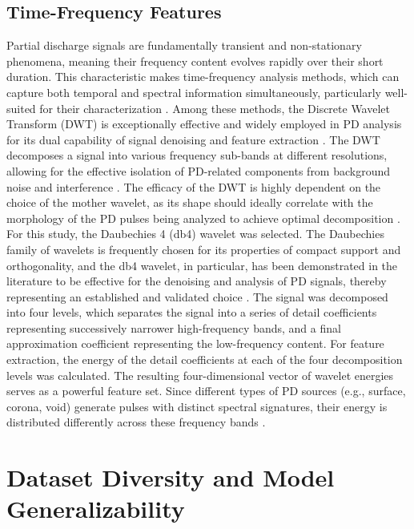\subsection{Time-Frequency Features}

Partial discharge signals are fundamentally transient and non-stationary phenomena, meaning their frequency content evolves rapidly over their short duration. This characteristic makes time-frequency analysis methods, which can capture both temporal and spectral information simultaneously, particularly well-suited for their characterization \parencite{Li_2018}. Among these methods, the Discrete Wavelet Transform (DWT) is exceptionally effective and widely employed in PD analysis for its dual capability of signal denoising and feature extraction \parencite{Lu_2020_2}. The DWT decomposes a signal into various frequency sub-bands at different resolutions, allowing for the effective isolation of PD-related components from background noise and interference \parencite{Sahnoune_2024}. The efficacy of the DWT is highly dependent on the choice of the mother wavelet, as its shape should ideally correlate with the morphology of the PD pulses being analyzed to achieve optimal decomposition \parencite{Sahnoune_2024}. For this study, the Daubechies 4 (db4) wavelet was selected. The Daubechies family of wavelets is frequently chosen for its properties of compact support and orthogonality, and the db4 wavelet, in particular, has been demonstrated in the literature to be effective for the denoising and analysis of PD signals, thereby representing an established and validated choice \parencite{Wang_2020_10}. The signal was decomposed into four levels, which separates the signal into a series of detail coefficients representing successively narrower high-frequency bands, and a final approximation coefficient representing the low-frequency content. For feature extraction, the energy of the detail coefficients at each of the four decomposition levels was calculated. The resulting four-dimensional vector of wavelet energies serves as a powerful feature set. Since different types of PD sources (e.g., surface, corona, void) generate pulses with distinct spectral signatures, their energy is distributed differently across these frequency bands \parencite{Gao_2023_1}. \section{Dataset Diversity and Model Generalizability}

